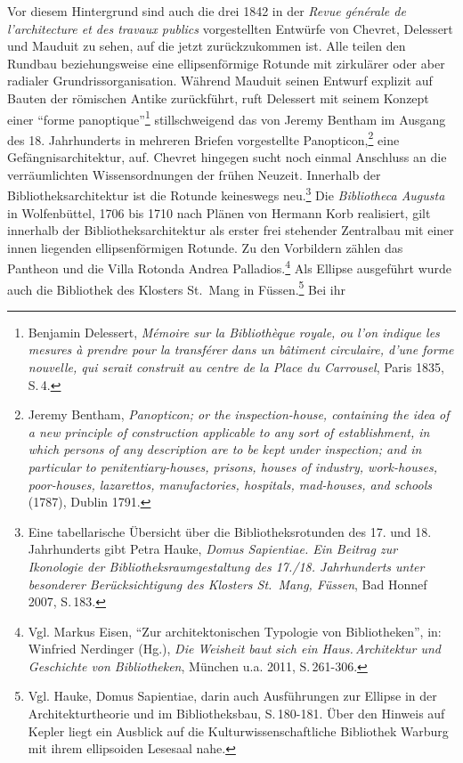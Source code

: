 Vor diesem Hintergrund sind auch die drei 1842 in der \emph{Revue
générale de l'architecture et des travaux publics} vorgestellten
Entwürfe von Chevret, Delessert und Mauduit zu sehen, auf die jetzt
zurückzukommen ist. Alle teilen den Rundbau beziehungsweise eine
ellipsenförmige Rotunde mit zirkulärer oder aber radialer
Grundrissorganisation. Während Mauduit seinen Entwurf explizit auf
Bauten der römischen Antike zurückführt, ruft Delessert mit seinem
Konzept einer \enquote{forme panoptique}\footnote{Benjamin Delessert,
  \emph{Mémoire sur la Bibliothèque royale, ou l'on indique les mesures
  à prendre pour la transférer dans un bâtiment circulaire, d'une forme
  nouvelle, qui serait construit au centre de la Place du Carrousel},
  Paris 1835, S.\,4.} stillschweigend das von Jeremy Bentham im Ausgang
des 18. Jahrhunderts in mehreren Briefen vorgestellte
Panopticon,\footnote{Jeremy Bentham, \emph{Panopticon; or the
  inspection-house, containing the idea of a new principle of
  construction applicable to any sort of establishment, in which persons
  of any description are to be kept under inspection; and in particular
  to penitentiary-houses, prisons, houses of industry, work-houses,
  poor-houses, lazarettos, manufactories, hospitals, mad-houses, and
  schools} (1787), Dublin 1791.} eine Gefängnisarchitektur, auf. Chevret
hingegen sucht noch einmal Anschluss an die verräumlichten
Wissensordnungen der frühen Neuzeit. Innerhalb der
Bibliotheksarchitektur ist die Rotunde keineswegs neu.\footnote{Eine
  tabellarische Übersicht über die Bibliotheksrotunden des 17. und 18.
  Jahrhunderts gibt Petra Hauke, \emph{Domus Sapientiae. Ein Beitrag zur
  Ikonologie der Bibliotheksraumgestaltung des 17./18. Jahrhunderts
  unter besonderer Berücksichtigung des Klosters St.~Mang, Füssen}, Bad
  Honnef 2007, S.\,183.} Die \emph{Bibliotheca Augusta} in Wolfenbüttel,
1706 bis 1710 nach Plänen von Hermann Korb realisiert, gilt innerhalb
der Bibliotheksarchitektur als erster frei stehender Zentralbau mit
einer innen liegenden ellipsenförmigen Rotunde. Zu den Vorbildern zählen
das Pantheon und die Villa Rotonda Andrea Palladios.\footnote{Vgl.
  Markus Eisen, \enquote{Zur architektonischen Typologie von
  Bibliotheken}, in: Winfried Nerdinger (Hg.), \emph{Die Weisheit baut
  sich ein Haus.\,Architektur und Geschichte von Bibliotheken}, München
  u.a. 2011, S.\,261-306.} Als Ellipse ausgeführt wurde auch die
Bibliothek des Klosters St.~Mang in Füssen.\footnote{Vgl. Hauke, Domus
  Sapientiae, darin auch Ausführungen zur Ellipse in der
  Architekturtheorie und im Bibliotheksbau, S.\,180-181. Über den Hinweis
  auf Kepler liegt ein Ausblick auf die Kulturwissenschaftliche
  Bibliothek Warburg mit ihrem ellipsoiden Lesesaal nahe.} Bei ihr
